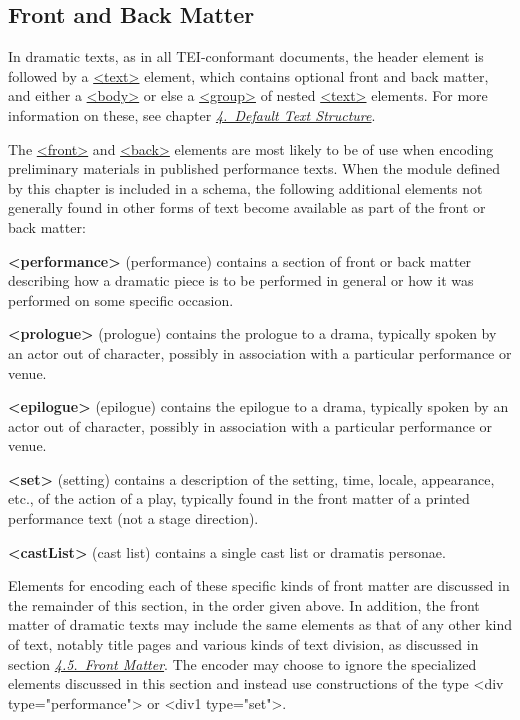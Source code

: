 \subsection[{Front and Back Matter }]{Front and Back Matter }\label{DRFAB}\par
In dramatic texts, as in all TEI-conformant documents, the header element is followed by a \hyperref[TEI.text]{<text>} element, which contains optional front and back matter, and either a \hyperref[TEI.body]{<body>} or else a \hyperref[TEI.group]{<group>} of nested \hyperref[TEI.text]{<text>} elements. For more information on these, see chapter \textit{\hyperref[DS]{4.\ Default Text Structure}}.\par
The \hyperref[TEI.front]{<front>} and \hyperref[TEI.back]{<back>} elements are most likely to be of use when encoding preliminary materials in published performance texts. When the module defined by this chapter is included in a schema, the following additional elements not generally found in other forms of text become available as part of the front or back matter: 
\begin{sansreflist}
  
\item [\textbf{<performance>}] (performance) contains a section of front or back matter describing how a dramatic piece is to be performed in general or how it was performed on some specific occasion.
\item [\textbf{<prologue>}] (prologue) contains the prologue to a drama, typically spoken by an actor out of character, possibly in association with a particular performance or venue.
\item [\textbf{<epilogue>}] (epilogue) contains the epilogue to a drama, typically spoken by an actor out of character, possibly in association with a particular performance or venue.
\item [\textbf{<set>}] (setting) contains a description of the setting, time, locale, appearance, etc., of the action of a play, typically found in the front matter of a printed performance text (not a stage direction).
\item [\textbf{<castList>}] (cast list) contains a single cast list or dramatis personae.
\end{sansreflist}
\par
Elements for encoding each of these specific kinds of front matter are discussed in the remainder of this section, in the order given above. In addition, the front matter of dramatic texts may include the same elements as that of any other kind of text, notably title pages and various kinds of text division, as discussed in section \textit{\hyperref[DSFRONT]{4.5.\ Front Matter}}. The encoder may choose to ignore the specialized elements discussed in this section and instead use constructions of the type <div type="performance"> or <div1 type="set">.\par
